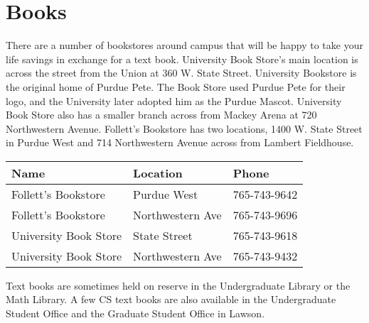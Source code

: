 \section{Books}

There are a number of bookstores around campus that will be happy to take your life savings in exchange for a text book. University Book Store's main location is across the street from the Union at 360 W. State Street. University Bookstore is the original home of Purdue Pete. The Book Store used Purdue Pete for their logo, and the University later adopted him as the Purdue Mascot. University Book Store also has a smaller branch across from Mackey Arena at 720 Northwestern Avenue. Follett's Bookstore has two locations, 1400 W. State Street in Purdue West and 714 Northwestern Avenue across from Lambert Fieldhouse.

\begin{table}[h]
	\centering
	\begin{tabular}{@{}lll@{}}
		\toprule
		\textbf{Name} & \textbf{Location} & \textbf{Phone} \\
		\midrule
		Follett's Bookstore & Purdue West & 765-743-9642 \\
		Follett's Bookstore & Northwestern Ave & 765-743-9696 \\
		University Book Store & State Street & 765-743-9618 \\
		University Book Store & Northwestern Ave & 765-743-9432 \\
		\bottomrule
	\end{tabular}
\end{table}

Text books are sometimes held on reserve in the Undergraduate Library or the Math Library. A few CS text books are also available in the Undergraduate Student Office and the Graduate Student Office in Lawson.

